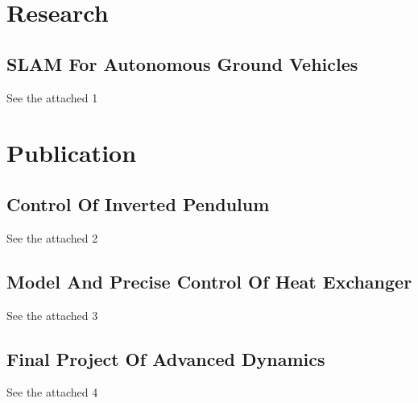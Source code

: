 \documentclass[a4paper,12pt,final]{memoir}
\begin{document}
\newpage
\framebreak
\framebreak

\section{Research}
\subsection{SLAM For Autonomous Ground Vehicles}
See the attached 1

\section{Publication}
\subsection{Control Of Inverted Pendulum}
See the attached 2

\subsection{Model And Precise Control Of Heat Exchanger}
See the attached 3

\subsection{Final Project Of Advanced Dynamics}
See the attached 4

\end{document}
